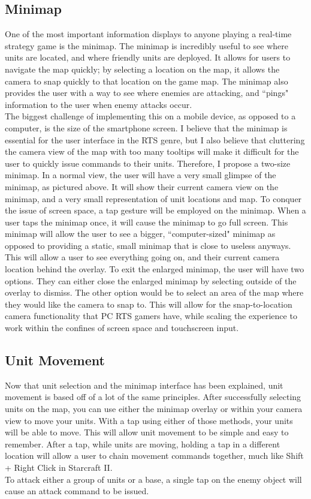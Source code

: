 \documentclass[11pt]{article}
\begin{document}
	\subsection{Minimap}
	One of the most important information displays to anyone playing a real-time strategy game is the minimap. The minimap is incredibly useful to see where units are located, and where friendly units are deployed. It allows for users to navigate the map quickly; by selecting a location on the map, it allows the camera to snap quickly to that location on the game map. The minimap also provides the user with a way to see where enemies are attacking, and ``pings" information to the user when enemy attacks occur.\\
	The biggest challenge of implementing this on a mobile device, as opposed to a computer, is the size of the smartphone screen. I believe that the minimap is essential for the user interface in the RTS genre, but I also believe that cluttering the camera view of the map with too many tooltips will make it difficult for the user to quickly issue commands to their units. Therefore, I propose a two-size minimap.
	In a normal view, the user will have a very small glimpse of the minimap, as pictured above. It will show their current camera view on the minimap, and a very small representation of unit locations and map. To conquer the issue of screen space, a tap gesture will be employed on the minimap. When a user taps the minimap once, it will cause the minimap to go full screen. This minimap will allow the user to see a bigger, ``computer-sized" minimap as opposed to providing a static, small minimap that is close to useless anyways. This will allow a user to see everything going on, and their current camera location behind the overlay. To exit the enlarged minimap, the user will have two options. They can either close the enlarged minimap by selecting outside of the overlay to dismiss. The other option would be to select an area of the map where they would like the camera to snap to. This will allow for the snap-to-location camera functionality that PC RTS gamers have, while scaling the experience to work within the confines of screen space and touchscreen input.
	\subsection{Unit Movement}
	Now that unit selection and the minimap interface has been explained, unit movement is based off of a lot of the same principles. After successfully selecting units on the map, you can use either the minimap overlay or within your camera view to move your units. With a tap using either of those methods, your units will be able to move. This will allow unit movement to be simple and easy to remember. After a tap, while units are moving, holding a tap in a different location will allow a user to chain movement commands together, much like Shift + Right Click in Starcraft II.\\
	To attack either a group of units or a base, a single tap on the enemy object will cause an attack command to be issued.
\end{document}
